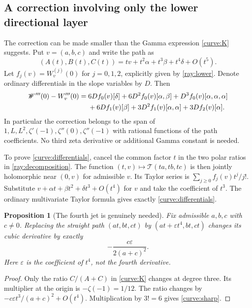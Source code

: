 \documentclass[11pt]{article}
\numberwithin{equation}{section}
\newtheorem{proposition}[theorem]{Proposition}
\theoremstyle{definition}
\theoremstyle{remark}
\newcommand{\T}{\mathcal T}
\begin{document}
\subsection{A correction involving only the lower directional layer}

The correction can be made smaller than the Gamma expression
\eqref{curve:K} suggests. Put $v=(a,b,c)$ and write the path as
\[
 (A(t),B(t),C(t))=tv+t^2\alpha+t^3\beta+t^4\delta+O(t^5).
\]
Let $f_j(v)=W_v^{(j)}(0)$ for $j=0,1,2$, explicitly given by
\eqref{ray:lower}. Denote ordinary differentials in the slope
variables by $D$. Then
\begin{align}
 \mathscr W'''(0)-W_v'''(0)={}&
 6Df_0(v)[\delta]+6D^2f_0(v)[\alpha,\beta]
                  +D^3f_0(v)[\alpha,\alpha,\alpha]\notag\\
 &+6Df_1(v)[\beta]+3D^2f_1(v)[\alpha,\alpha]
                  +3Df_2(v)[\alpha].
 \label{curve:differentials}
\end{align}
In particular the correction belongs to the span of
$1,L,L^2,\zeta'(-1),\zeta''(0),\zeta''(-1)$ with rational
functions of the path coefficients. No third zeta derivative or
additional Gamma constant is needed.

To prove \eqref{curve:differentials}, cancel the common factor $t$
in the two polar ratios in \eqref{ray:decomposition}. The function
$(t,v)\mapsto\T(ta,tb,tc)$ is then jointly holomorphic near
$(0,v)$ for admissible $v$. Its Taylor series is
$\sum_{j\ge0}f_j(v)t^j/j!$. Substitute
$v+\alpha t+\beta t^2+\delta t^3+O(t^4)$ for $v$ and take
the coefficient of $t^3$. The ordinary multivariate Taylor formula
gives exactly \eqref{curve:differentials}.

\begin{proposition}[The fourth jet is genuinely needed]\label{prop:sharpcurve}
Fix admissible $a,b,c$ with $c\ne0$. Replacing the straight path
$(at,bt,ct)$ by $(at+\varepsilon t^4,bt,ct)$ changes its cubic
derivative by exactly
\begin{equation}\label{curve:sharp}
 -\frac{c\varepsilon}{2(a+c)^2}.
\end{equation}
Here $\varepsilon$ is the coefficient of $t^4$, not the fourth derivative.
\end{proposition}
\begin{proof}
Only the ratio $C/(A+C)$ in \eqref{curve:K} changes at degree three.
Its multiplier at the origin is $-\zeta(-1)=1/12$. The ratio changes by
$-c\varepsilon t^3/(a+c)^2+O(t^4)$. Multiplication by $3!=6$
gives \eqref{curve:sharp}.
\end{proof}
\end{document}
